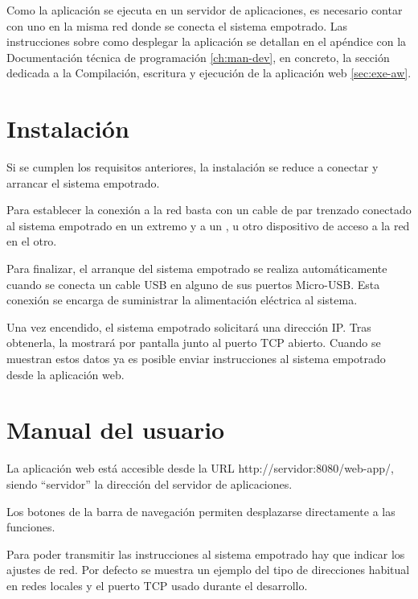 Como la aplicación se ejecuta en un servidor de aplicaciones, es necesario
contar con uno en la misma red donde se conecta el sistema empotrado. Las
instrucciones sobre como desplegar la aplicación se detallan en el apéndice
con la Documentación técnica de programación \ref{ch:man-dev}, en concreto, la
sección dedicada a la Compilación, escritura y ejecución de la aplicación web
\ref{sec:exe-aw}.



\section{Instalación} \label{sec:man-user-inst}
Si se cumplen los requisitos anteriores, la instalación se reduce a conectar y
arrancar el sistema empotrado.

Para establecer la conexión a la red basta con un cable de par trenzado
conectado al sistema empotrado en un extremo y a un ,
 u otro dispositivo de acceso a la red en el
otro.

Para finalizar, el arranque del sistema empotrado se realiza automáticamente
cuando se conecta un cable USB en alguno de sus puertos Micro-USB. Esta conexión
se encarga de suministrar la alimentación eléctrica al sistema.


Una vez encendido, el sistema empotrado solicitará una dirección IP. Tras
obtenerla, la mostrará por pantalla junto al puerto TCP abierto.
Cuando se muestran estos datos ya es posible enviar instrucciones al sistema
empotrado desde la aplicación web.



\section{Manual del usuario} \label{sec:man-user}
La aplicación web está accesible desde la URL http://servidor:8080/web-app/,
siendo ``servidor'' la dirección del servidor de aplicaciones.


Los botones de la barra de navegación permiten desplazarse directamente a las
funciones.


Para poder transmitir las instrucciones al sistema empotrado hay que indicar
los ajustes de red. Por defecto se muestra un ejemplo del tipo de direcciones
habitual en redes locales y el puerto TCP usado durante el desarrollo.

